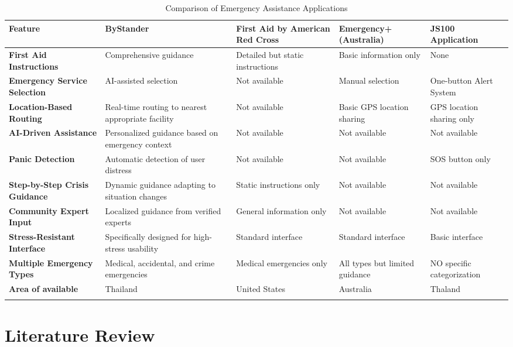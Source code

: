 \begin{longtable}{|p{3cm}|p{3cm}|p{3cm}|p{3cm}|p{3cm}|}
    \hline
    \textbf{Feature} & \textbf{ByStander} & \textbf{First Aid by American Red Cross} & \textbf{Emergency+ (Australia)} & \textbf{JS100 Application} \\
    \hline
    \textbf{First Aid Instructions} & Comprehensive guidance & Detailed but static instructions & Basic information only & None \\
    \hline
    \textbf{Emergency Service Selection} & AI-assisted selection & Not available & Manual selection & One-button Alert System \\
    \hline
    \textbf{Location-Based Routing} & Real-time routing to nearest appropriate facility & Not available & Basic GPS location sharing & GPS location sharing only \\
    \hline
    \textbf{AI-Driven Assistance} & Personalized guidance based on emergency context & Not available & Not available & Not available \\
    \hline
    \textbf{Panic Detection} & Automatic detection of user distress & Not available & Not available & SOS button only \\
    \hline
    \textbf{Step-by-Step Crisis Guidance} & Dynamic guidance adapting to situation changes & Static instructions only & Not available & Not available \\
    \hline
    \textbf{Community Expert Input} & Localized guidance from verified experts & General information only & Not available & Not available \\
    \hline
    \textbf{Stress-Resistant Interface} & Specifically designed for high-stress usability & Standard interface & Standard interface & Basic interface \\
    \hline
    \hline
    \textbf{Multiple Emergency Types} & Medical, accidental, and crime emergencies & Medical emergencies only & All types but limited guidance & NO specific categorization \\
    \hline
    \textbf{Area of available} & Thailand & United States & Australia & Thaland \\
    \hline
\caption{Comparison of Emergency Assistance Applications}
\label{tab:competitor-analysis}
\end{longtable}
    
\section{Literature Review}
\label{section:literature-review}


